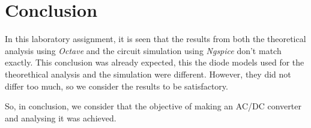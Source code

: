 \section{Conclusion}
\label{sec:conclusion}

In this laboratory assignment, it is seen that the results from both the theoretical analysis using \textit{Octave} and the circuit simulation using \textit{Ngspice} don't match exactly. This conclusion was already expected, this the diode models used for the theorethical analysis and the simulation were different. However, they did not differ too much, so we consider the results to be satisfactory.
\par
So, in conclusion, we consider that the objective of making an AC/DC converter and analysing it was achieved.   
